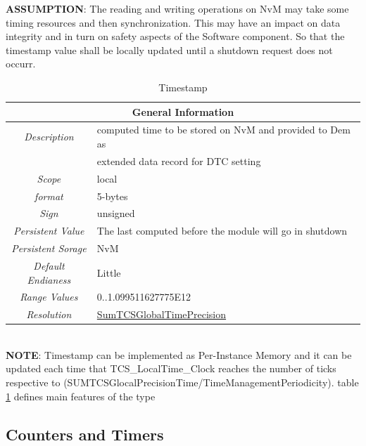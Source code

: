 \textbf{ASSUMPTION}: The reading and writing operations on NvM may take some timing resources and then synchronization. This may have an impact on data integrity and in turn on safety aspects
of the Software component. So that the timestamp value shall be locally updated until a shutdown request does not occurr.

\begin{table}[h!]
	\centering
	\begin{tabular}{|c|l|}
		\hline
		\multicolumn{2}{|c|}{\cellcolor{ETASlightgray}\textbf{General Information}}\\
		\hline
		\cellcolor{ETASlightgray} \textit{Description} & computed time to be stored on NvM and provided to Dem as\\
		\cellcolor{ETASlightgray} & extended data record for DTC setting\\
		\hline
		\cellcolor{ETASlightgray} \textit{Scope} & local\\
		\hline
		\cellcolor{ETASlightgray} \textit{format} & 5-bytes \\
		\hline
		\cellcolor{ETASlightgray} \textit{Sign} & unsigned \\
		\hline
		\cellcolor{ETASlightgray} \textit{Persistent Value} & The last computed before the module  will go in shutdown\\
		\hline
		\cellcolor{ETASlightgray} \textit{Persistent Sorage} & NvM \\
		\hline
		\cellcolor{ETASlightgray} \textit{Default Endianess} & Little \\
		\hline
		\cellcolor{ETASlightgray} \textit{Range Values} & 0..1.099511627775E12\\
		\hline
		\cellcolor{ETASlightgray} \textit{Resolution} & \hyperref[conf:SumTCSGlobalTimePrecision]{SumTCSGlobalTimePrecision} \\
		\hline
	\end{tabular}
	\caption{Timestamp}
	\label{tab:timestamp}
\end{table}

\\
\textbf{NOTE}: Timestamp can be implemented as Per-Instance Memory and it can be updated each time that TCS_LocalTime_Clock reaches the number of ticks respective to (SUMTCSGlocalPrecisionTime/TimeManagementPeriodicity).
table \ref{tab:timestamp} defines main features of the type
\\
{}


\subsection{Counters and Timers}

